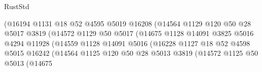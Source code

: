 \begin{lexlean}{RustStd}
\begin{coremodule}
                                        (@16194
                                          @1131
                                          @18
                                          @52
                                          @4595
                                          @5019
                                          @16208
                                          (@14564
                                            @1129
                                            @120
                                            @50
                                            @28
                                            @5017
                                            @3819
                                            (@14572
                                              @1129
                                              @50
                                              @5017
                                              (@14675
                                                @1128
                                                @14091
                                                @3825
                                                @5016
                                                @4294
                                                @11928
                                                (@14559
                                                  @1128
                                                  @14091
                                                  @5016
                                                  (@16228
                                                    @1127
                                                    @18
                                                    @52
                                                    @4598
                                                    @5015
                                                    @16242
                                                    (@14564
                                                      @1125
                                                      @120
                                                      @50
                                                      @28
                                                      @5013
                                                      @3819
                                                      (@14572
                                                        @1125
                                                        @50
                                                        @5013
                                                        (@14675

\end{coremodule}
\end{lexlean}
